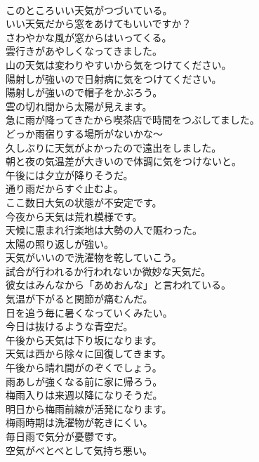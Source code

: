 \documentclass[8pt]{extreport}
\begin{document}
\begin{CJK}{UTF8}{min}
\\	このところいい天気がつづいている。	
\\	いい天気だから窓をあけてもいいですか？	
\\	さわやかな風が窓からはいってくる。	
\\	雲行きがあやしくなってきました。	
\\	山の天気は変わりやすいから気をつけてください。	
\\	陽射しが強いので日射病に気をつけてください。	
\\	陽射しが強いので帽子をかぶろう。	
\\	雲の切れ間から太陽が見えます。	
\\	急に雨が降ってきたから喫茶店で時間をつぶしてました。	
\\	どっか雨宿りする場所がないかな～	
\\	久しぶりに天気がよかったので遠出をしました。	
\\	朝と夜の気温差が大きいので体調に気をつけないと。	
\\	午後には夕立が降りそうだ。	
\\	通り雨だからすぐ止むよ。	
\\	ここ数日大気の状態が不安定です。	
\\	今夜から天気は荒れ模様です。	
\\	天候に恵まれ行楽地は大勢の人で賑わった。	
\\	太陽の照り返しが強い。	
\\	天気がいいので洗濯物を乾していこう。	
\\	試合が行われるか行われないか微妙な天気だ。	
\\	彼女はみんなから「あめおんな」と言われている。	
\\	気温が下がると関節が痛むんだ。	
\\	日を追う毎に暑くなっていくみたい。	
\\	今日は抜けるような青空だ。	
\\	午後から天気は下り坂になります。	
\\	天気は西から除々に回復してきます。	
\\	午後から晴れ間がのぞくでしょう。	
\\	雨あしが強くなる前に家に帰ろう。	
\\	梅雨入りは来週以降になりそうだ。	
\\	明日から梅雨前線が活発になります。	
\\	梅雨時期は洗濯物が乾きにくい。	
\\	毎日雨で気分が憂鬱です。	
\\	空気がべとべとして気持ち悪い。	

\end{CJK}
\end{document}
